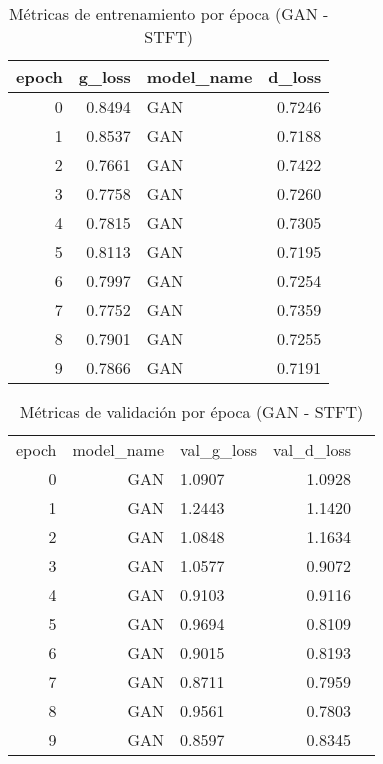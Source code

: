 \begin{table}
\centering
\caption{Métricas de entrenamiento por época (GAN - STFT)}
\label{tab:gan_train_epoch}
\begin{tabular}{rrlr}
\toprule
 epoch &  g\_loss & model\_name &  d\_loss \\
\midrule
     0 &  0.8494 &        GAN &  0.7246 \\
     1 &  0.8537 &        GAN &  0.7188 \\
     2 &  0.7661 &        GAN &  0.7422 \\
     3 &  0.7758 &        GAN &  0.7260 \\
     4 &  0.7815 &        GAN &  0.7305 \\
     5 &  0.8113 &        GAN &  0.7195 \\
     6 &  0.7997 &        GAN &  0.7254 \\
     7 &  0.7752 &        GAN &  0.7359 \\
     8 &  0.7901 &        GAN &  0.7255 \\
     9 &  0.7866 &        GAN &  0.7191 \\
\bottomrule
\end{tabular}
\end{table}


\begin{table}
\centering
\caption{Métricas de validación por época (GAN - STFT)}
\label{tab:gan_val_epoch}
\begin{tabular}{rrlrr}
\toprule
 epoch &  model\_name &  val\_g\_loss &  val\_d\_loss \\
     0 &        GAN &      1.0907 &      1.0928 \\
     1 &        GAN &      1.2443 &      1.1420 \\
     2 &        GAN &      1.0848 &      1.1634 \\
     3 &        GAN &      1.0577 &      0.9072 \\
     4 &        GAN &      0.9103 &      0.9116 \\
     5 &        GAN &      0.9694 &      0.8109 \\
     6 &        GAN &      0.9015 &      0.8193 \\
     7 &        GAN &      0.8711 &      0.7959 \\
     8 &        GAN &      0.9561 &      0.7803 \\
     9 &        GAN &      0.8597 &      0.8345 \\
\bottomrule
\end{tabular}
\end{table}

